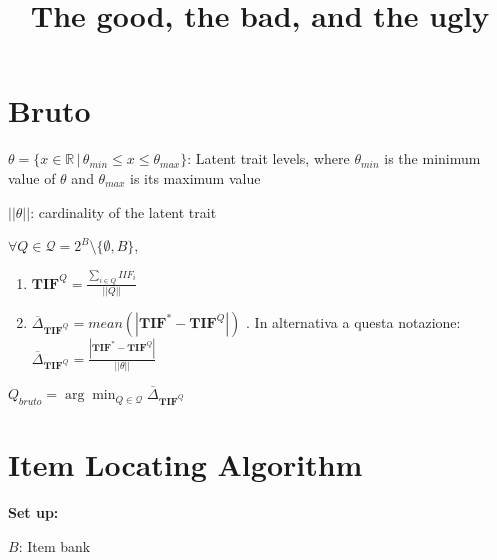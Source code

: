 \documentclass[12pt, a4paper, titilepage]{article}
\title{The good, the bad, and the ugly}
\author{}
\begin{document}
\maketitle

\begin{abstract}

\end{abstract}

\newpage

\doublespacing


\section{Bruto}


$ \theta = \{ x \in \mathbb{R} \,|\, \theta_{min} \leq x \leq \theta_{max} \}$: Latent trait levels, where $\theta_{min}$ is the minimum value of $\theta$ and $\theta_{max}$ is its maximum value 

$||\theta||$: cardinality of the latent trait



$\forall Q \in\mathcal{Q} = 2^B \setminus \{\emptyset, B\}$, 

\begin{enumerate}
	\item $\mathbf{TIF}^{Q} =  \frac{\sum_{i \in Q} IIF_i}{||Q||}$
	\item $\overline{\Delta}_{\mathbf{TIF}^{Q}} =  \mathit{mean}(|\mathbf{TIF}^* - \mathbf{TIF}^{Q}|)$  . In alternativa a questa notazione: $\overline{\Delta}_{\mathbf{TIF}^{Q}} = \frac{|\mathbf{TIF}^* - \mathbf{TIF}^{Q}|}{||\theta||}$
	
\end{enumerate}



$Q_{bruto} = \arg \min_{Q \in \mathcal{Q}} \overline{\Delta}_{\mathbf{TIF}^{Q}}$



\section{Item Locating Algorithm}


\textbf{Set up: }

$B$: Item bank 
\end{document}
